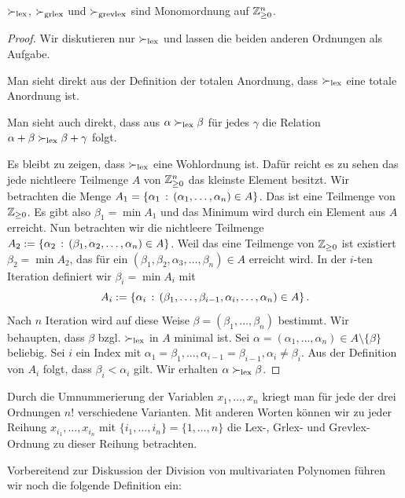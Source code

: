 \documentclass[11pt]{article}
\numberwithin{equation}{section}
\begin{document}

\begin{proposition} 
	$\succ_{\operatorname{lex}}$, $\succ_{\operatorname{grlex}}$ und $\succ_{\operatorname{grevlex}}$ sind Monomordnung auf $\mathbb{Z}_{\ge 0}^n$. 
\end{proposition} 
\begin{proof} 
	Wir diskutieren nur $\succ_{\operatorname{lex}}$ und lassen die beiden anderen Ordnungen als Aufgabe. 
	
	Man sieht direkt aus der Definition der totalen Anordnung, dass $\succ_{\operatorname{lex}}$ eine totale Anordnung ist. 
	
	Man sieht auch direkt, dass aus $\alpha \succ_{\operatorname{lex}} \beta$ für jedes $\gamma$ die Relation $\alpha + \beta \succ_{\operatorname{lex}} \beta + \gamma$ folgt. 
	
	Es bleibt zu zeigen, dass $\succ_{\operatorname{lex}}$ eine Wohlordnung ist. Dafür reicht es zu sehen das jede nichtleere  Teilmenge $A$ von $\mathbb{Z}_{\ge 0}^n$ das kleinste Element besitzt. Wir betrachten die Menge $A_1 = \left\{ \alpha_1 \,:\,  (\alpha_1,\ldots,\alpha_n) \in A \right\}$. Das ist eine Teilmenge von $\mathbb{Z}_{\ge 0}$. Es gibt also $\beta_1 = \min A_1$ und das Minimum wird durch ein Element aus $A$ erreicht. Nun betrachten wir die nichtleere Teilmenge $A_2 := \left\{ \alpha_2 \,:\, (\beta_1,\alpha_2,\ldots,\alpha_n) \in A \right\}$. Weil das eine Teilmenge von $\mathbb{Z}_{\ge 0}$ ist existiert $\beta_2 = \min A_2$, das für ein $(\beta_1,\beta_2,\alpha_3, \ldots,\beta_n) \in A$ erreicht wird. In der $i$-ten Iteration definiert wir $\beta_i = \min A_i$ mit
	\[
		A_i := \left\{ \alpha_i \,:\, (\beta_1,\ldots,\beta_{i-1}, \alpha_i,\ldots, \alpha_n) \in A \right\}.
	\] 
	Nach $n$ Iteration wird auf diese Weise $\beta = (\beta_1,\ldots, \beta_n)$ bestimmt. Wir behaupten, dass $\beta$ bzgl. $\succ_{\operatorname{lex}}$ in $A$ minimal ist. Sei $\alpha = (\alpha_1,\ldots,\alpha_n) \in A \setminus \{\beta\}$ beliebig. Sei $i$ ein Index mit $\alpha_1 = \beta_1,\ldots,\alpha_{i-1} = \beta_{i-1}, \alpha_i \ne \beta_i$. 
	Aus der Definition von $A_i$ folgt, dass $\beta_i < \alpha_i$ gilt. Wir erhalten $\alpha \succ_{\operatorname{lex}} \beta$. 
\end{proof} 

Durch die Umnummerierung der Variablen $x_1,\ldots,x_n$ kriegt man für jede der drei Ordnungen $n!$ verschiedene Varianten. Mit anderen Worten können wir zu jeder Reihung $x_{i_1},\ldots, x_{i_n}$ mit $\{i_1,\ldots,i_n\} = \{1,\ldots,n\}$ die Lex-, Grlex- und Grevlex-Ordnung zu dieser Reihung betrachten. 

Vorbereitend zur Diskussion der Division von multivariaten Polynomen führen wir noch die folgende Definition ein: 
\end{document}
